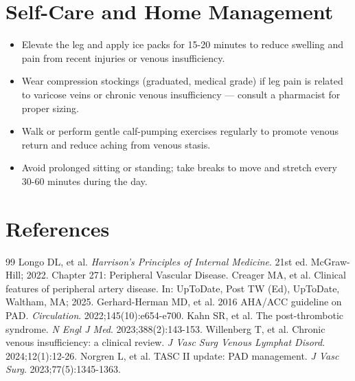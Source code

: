 \section*{Self-Care and Home Management}
\begin{itemize}
  \item Elevate the leg and apply ice packs for 15-20 minutes to reduce swelling and pain from recent injuries or venous insufficiency.
  \item Wear compression stockings (graduated, medical grade) if leg pain is related to varicose veins or chronic venous insufficiency — consult a pharmacist for proper sizing.
  \item Walk or perform gentle calf-pumping exercises regularly to promote venous return and reduce aching from venous stasis.
  \item Avoid prolonged sitting or standing; take breaks to move and stretch every 30-60 minutes during the day.
\end{itemize}

\section*{References}

\begin{thebibliography}{99}
 Longo DL, et al. \emph{Harrison's Principles of Internal Medicine}. 21st ed. McGraw-Hill; 2022. Chapter 271: Peripheral Vascular Disease.
 Creager MA, et al. Clinical features of peripheral artery disease. In: UpToDate, Post TW (Ed), UpToDate, Waltham, MA; 2025.
 Gerhard-Herman MD, et al. 2016 AHA/ACC guideline on PAD. \emph{Circulation}. 2022;145(10):e654-e700.
 Kahn SR, et al. The post-thrombotic syndrome. \emph{N Engl J Med}. 2023;388(2):143-153.
 Willenberg T, et al. Chronic venous insufficiency: a clinical review. \emph{J Vasc Surg Venous Lymphat Disord}. 2024;12(1):12-26.
 Norgren L, et al. TASC II update: PAD management. \emph{J Vasc Surg}. 2023;77(5):1345-1363.
\end{thebibliography}
